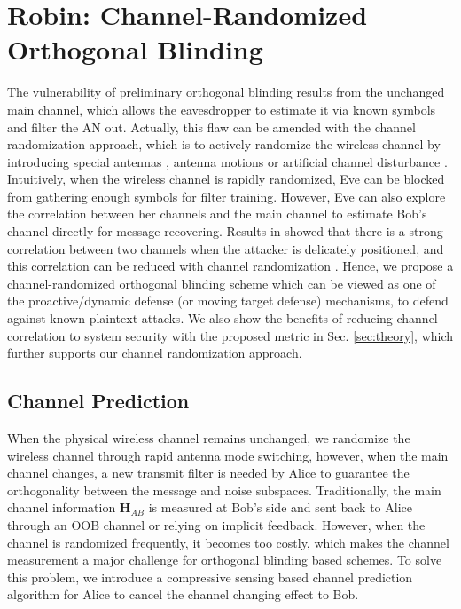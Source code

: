 \section{Robin: Channel-Randomized Orthogonal Blinding}
The vulnerability of preliminary orthogonal blinding results from the unchanged main channel, which allows the eavesdropper to estimate it via known symbols and filter the AN out. Actually, this flaw can be amended with the channel randomization approach, which is to actively randomize the wireless channel by introducing special antennas \cite{aono2005wireless,pan2017message}, antenna motions \cite{hassanieh2015securing} or artificial channel disturbance \cite{hou2015message}. Intuitively, when the wireless channel is rapidly randomized, 
Eve can be blocked from gathering enough symbols for filter training. 
However, Eve can also explore the correlation between her channels and the main channel to estimate Bob's channel directly for message recovering. Results in \cite{popper2011investigation,pan2017message} showed that there is a strong correlation between two channels when the attacker is delicately positioned, and this correlation can be reduced with channel randomization \cite{pan2017message}. Hence, we propose a channel-randomized orthogonal blinding scheme which can be viewed as one of the proactive/dynamic defense (or moving target defense) mechanisms, to defend against known-plaintext attacks. 
We also show the benefits of reducing channel correlation to system security with the proposed metric in Sec. \ref{sec:theory}, which further supports our channel randomization approach.  

\subsection{Channel Prediction}
When the physical wireless channel remains unchanged, we randomize the wireless channel through rapid antenna mode switching, however, when the main channel changes, a new transmit filter is needed by Alice to guarantee the orthogonality between the message and noise subspaces. Traditionally, the main channel information $\mathbf{H}_{AB}$ is measured at Bob's side and sent back to Alice through an OOB channel or relying on implicit feedback.
However, when the channel is randomized frequently, it becomes too costly, 
which makes the channel measurement a major challenge for orthogonal blinding based schemes. To solve this problem, we introduce a compressive sensing based channel prediction algorithm for Alice to cancel the channel changing effect to Bob. 

